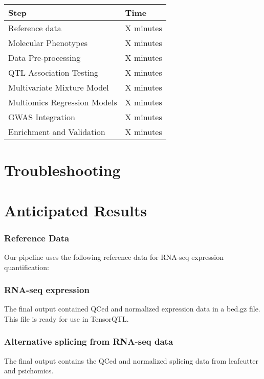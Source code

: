 \documentclass[12pt]{article}
\begin{document}
\begin{tabular}{|l|l|}
\hline
Step & Time \\
\hline
Reference data & X minutes \\
Molecular Phenotypes & X minutes \\
Data Pre-processing & X minutes \\
QTL Association Testing & X minutes \\
Multivariate Mixture Model & X minutes \\
Multiomics Regression Models & X minutes \\
GWAS Integration & X minutes \\
Enrichment and Validation & X minutes \\
\hline
\end{tabular}


\section*{Troubleshooting}





\section*{Anticipated Results}





\subsubsection*{Reference Data}

Our pipeline uses the following reference data for RNA-seq expression quantification:


\subsubsection*{RNA-seq expression}

The final output contained QCed and normalized expression data in a bed.gz file. This file is ready for use in TensorQTL.

\subsubsection*{Alternative splicing from RNA-seq data}

The final output contains the QCed and normalized splicing data from leafcutter and psichomics.
\end{document}
